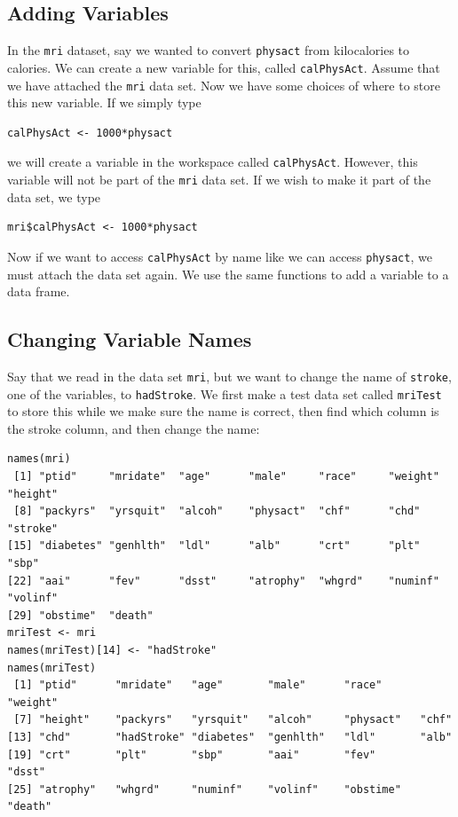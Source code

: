 \documentclass[11pt,letterpaper,fleqn]{report}
\begin{document}
\subsection{Adding Variables}
In the \texttt{mri} dataset, say we wanted to convert \texttt{physact} from kilocalories to calories. We can create a new variable for this, called \texttt{calPhysAct}. Assume that we have attached the \texttt{mri} data set. Now we have some choices of where to store this new variable. If we simply type \begin{verbatim}calPhysAct <- 1000*physact\end{verbatim} we will create a variable in the workspace called \texttt{calPhysAct}. However, this variable will not be part of the \texttt{mri} data set. If we wish to make it part of the data set, we type \begin{verbatim}mri$calPhysAct <- 1000*physact \end{verbatim} Now if we want to access \texttt{calPhysAct} by name like we can access \texttt{physact}, we must attach the data set again. We use the same functions to add a variable to a data frame.
\subsection{Changing Variable Names}
Say that we read in the data set \texttt{mri}, but we want to change the name of \texttt{stroke}, one of the variables, to \texttt{hadStroke}. We first make a test data set called \texttt{mriTest} to store this while we make sure the name is correct, then find which column is the stroke column, and then change the name: 
\begin{verbatim}
names(mri)
 [1] "ptid"     "mridate"  "age"      "male"     "race"     "weight"   "height"  
 [8] "packyrs"  "yrsquit"  "alcoh"    "physact"  "chf"      "chd"      "stroke"  
[15] "diabetes" "genhlth"  "ldl"      "alb"      "crt"      "plt"      "sbp"     
[22] "aai"      "fev"      "dsst"     "atrophy"  "whgrd"    "numinf"   "volinf"  
[29] "obstime"  "death"   
mriTest <- mri
names(mriTest)[14] <- "hadStroke"
names(mriTest)
 [1] "ptid"      "mridate"   "age"       "male"      "race"      "weight"   
 [7] "height"    "packyrs"   "yrsquit"   "alcoh"     "physact"   "chf"      
[13] "chd"       "hadStroke" "diabetes"  "genhlth"   "ldl"       "alb"      
[19] "crt"       "plt"       "sbp"       "aai"       "fev"       "dsst"     
[25] "atrophy"   "whgrd"     "numinf"    "volinf"    "obstime"   "death"  
\end{verbatim}
\end{document}

